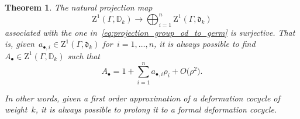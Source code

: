 \documentclass[10pt,a4paper]{article}
\numberwithin{equation}{section}
\let\oldbullet\bullet
\renewcommand{\bullet}{{\scriptscriptstyle\oldbullet}}
\theoremstyle{plain}
\newtheorem{theorem}[theoremcounter]{Theorem}
\theoremstyle{definition}
\newcommand{\tx}{\text}
\newcommand{\bbD}{\ensuremath{\mathbb{D}}}
\newcommand{\frakd}{\ensuremath{\mathfrak{d}}}
\newcommand{\rmZ}{\ensuremath{\mathrm{Z}}}
\let\Ga\Gamma
\begin{document}
\begin{theorem}
\label{thm:extension-of-first-order}
The natural projection map
\begin{equation*}
\rmZ^1(\Ga,\bbD_k)
\to
\bigoplus_{i=1}^n \rmZ^1(\Ga,\frakd_k)
\end{equation*}
associated with the one in~\eqref{eq:projection_group_od_to_germ} is surjective. That is, given~$a_{\bullet,i}\in \rmZ^1(\Gamma, \frakd_k)$ for~$i=1,\ldots,n$, it is always possible to find~$A_\bullet\in \rmZ^1(\Gamma,\bbD_k)$ such that
\begin{equation*}
A_\bullet = 1 + \sum_{i=1}^n a_{\bullet,i} \rho_i + O\bigl(\rho^2\bigr)
\tx{.}
\end{equation*}

In other words, given a first order approximation of a deformation cocycle of weight~$k$, it is always possible to prolong it to a formal deformation cocycle.
\end{theorem}
\end{document}
